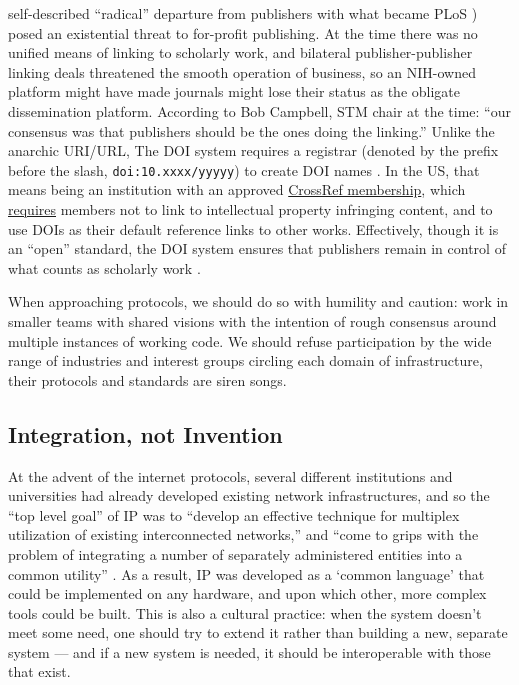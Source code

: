 self-described ``radical'' departure from publishers with what became
PLoS \citep{varmusArtPoliticsScience2009, robertsBuildingGenBankPublished2001} ) posed an existential threat to
for-profit publishing. At the time there was no unified means of linking
to scholarly work,
and bilateral publisher-publisher linking deals threatened the smooth
operation of business, so an NIH-owned platform might have made journals
might lose their status as the obligate dissemination platform.
According to Bob Campbell, STM chair at the time: ``our consensus was
that publishers should be the ones doing the linking.'' Unlike the
anarchic URI/URL, The DOI system requires a registrar (denoted by the
prefix before the slash, \texttt{doi:10.xxxx/yyyyy}) to create DOI names
\citep{isoISO2632420122012} . In the US, that means being an
institution with an approved
\href{https://www.crossref.org/services/content-registration/}{CrossRef
membership}, which
\href{https://www.crossref.org/membership/terms/}{requires} members not
to link to intellectual property infringing content, and to use DOIs as
their default reference links to other works. Effectively, though it is
an ``open''
standard, the DOI system ensures that publishers remain in control of
what counts as scholarly work \citep{crossrefFormationCrossRefShort2009} .

When approaching protocols, we should do so with humility and caution:
work in smaller teams with shared visions with the intention of rough
consensus around multiple instances of working code. We should refuse
participation by the wide range of industries and interest groups
circling each domain of infrastructure, their protocols and standards
are siren songs.

\hypertarget{integration-not-invention}{%
\subsection{Integration, not
Invention}\label{integration-not-invention}}

At the advent of the internet protocols, several different institutions
and universities had already developed existing network infrastructures,
and so the ``top level goal'' of IP was to ``develop an effective
technique for multiplex utilization of existing interconnected
networks,'' and ``come to grips with the problem of integrating a number
of separately administered entities into a common utility'' \citep{clarkDesignPhilosophyDARPA1988} . As a result, IP was developed as a
`common language' that could be implemented on any hardware, and upon
which other, more complex tools could be built. This is also a cultural
practice: when the system doesn't meet some need, one should try to
extend it rather than building a new, separate system --- and if a new
system is needed, it should be interoperable with those that exist.

